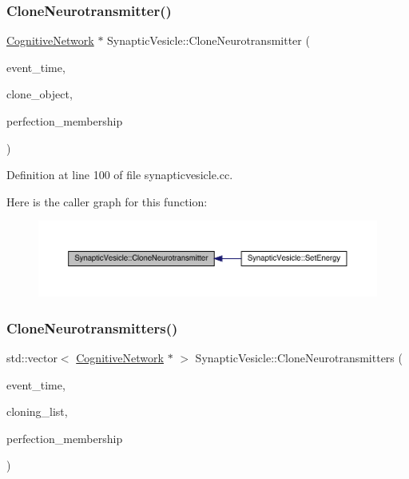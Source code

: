 \subsubsection{\texorpdfstring{Clone\+Neurotransmitter()}{CloneNeurotransmitter()}}
{\footnotesize\ttfamily \hyperlink{class_cognitive_network}{Cognitive\+Network} $\ast$ Synaptic\+Vesicle\+::\+Clone\+Neurotransmitter (\begin{DoxyParamCaption}\item[{std\+::chrono\+::time\+\_\+point$<$ \hyperlink{universe_8h_a0ef8d951d1ca5ab3cfaf7ab4c7a6fd80}{Clock} $>$}]{event\+\_\+time,  }\item[{\hyperlink{class_cognitive_network}{Cognitive\+Network} $\ast$}]{clone\+\_\+object,  }\item[{double}]{perfection\+\_\+membership }\end{DoxyParamCaption})}



Definition at line 100 of file synapticvesicle.\+cc.

Here is the caller graph for this function\+:\nopagebreak
\begin{figure}[H]
\begin{center}
\leavevmode
\includegraphics[width=350pt]{class_synaptic_vesicle_aa811e68d1a3220c07140847eb3ebc8b3_icgraph}
\end{center}
\end{figure}
\mbox{\label{class_synaptic_vesicle_aa610e38786a8c9978d9c00bca40a5200}} 
\subsubsection{\texorpdfstring{Clone\+Neurotransmitters()}{CloneNeurotransmitters()}}
{\footnotesize\ttfamily std\+::vector$<$ \hyperlink{class_cognitive_network}{Cognitive\+Network} $\ast$ $>$ Synaptic\+Vesicle\+::\+Clone\+Neurotransmitters (\begin{DoxyParamCaption}\item[{std\+::chrono\+::time\+\_\+point$<$ \hyperlink{universe_8h_a0ef8d951d1ca5ab3cfaf7ab4c7a6fd80}{Clock} $>$}]{event\+\_\+time,  }\item[{std\+::vector$<$ \hyperlink{class_cognitive_network}{Cognitive\+Network} $\ast$$>$}]{cloning\+\_\+list,  }\item[{double}]{perfection\+\_\+membership }\end{DoxyParamCaption})}




